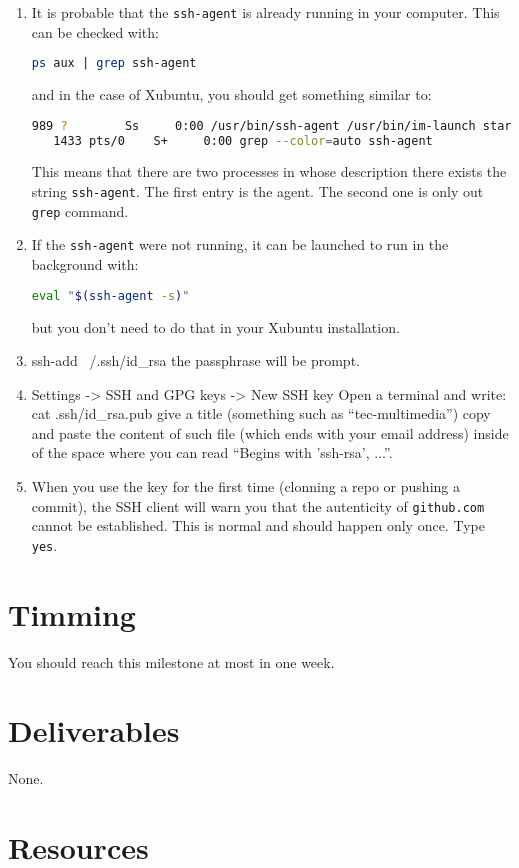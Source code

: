 \begin{enumerate}
\item It is probable that the \texttt{ssh-agent} is already
  running in your computer. This can be checked with:

  \begin{lstlisting}[language=bash]
    ps aux | grep ssh-agent
  \end{lstlisting}

  and in the case of Xubuntu, you should get something similar to:

  \begin{lstlisting}[language=bash]
    989 ?        Ss     0:00 /usr/bin/ssh-agent /usr/bin/im-launch startxfce4
   1433 pts/0    S+     0:00 grep --color=auto ssh-agent
  \end{lstlisting}

  This means that there are two processes in whose description there
  exists the string \texttt{ssh-agent}. The first entry is the
  agent. The second one is only out \texttt{grep} command.

\item If the \texttt{ssh-agent} were not running, it can be launched to
  run in the background with:

  \begin{lstlisting}[language=bash]
    eval "$(ssh-agent -s)"
  \end{lstlisting}

  but you don't need to do that in your Xubuntu installation.

\item ssh-add ~/.ssh/id_rsa the passphrase will be prompt.
  
\item Settings -> SSH and GPG keys -> New SSH key
  Open a terminal and write:
  cat .ssh/id_rsa.pub
  give a title (something such as ``tec-multimedia'')
  copy and paste the content of such file (which ends with your email address) inside of the space where you can read ``Begins with 'ssh-rsa', ...''.

  \item When you use the key for the first time (clonning a repo or
    pushing a commit), the SSH client will warn you that the
    autenticity of \texttt{github.com} cannot be established. This is
    normal and should happen only once. Type \texttt{yes}.
  
\end{enumerate}

\section{Timming}

You should reach this milestone at most in one week.

\section{Deliverables}

None.

\section{Resources}


